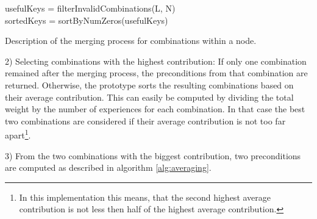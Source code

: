 \begin{algorithm}
	
	\BlankLine
	usefulKeys = filterInvalidCombinations(L, N) \\
	sortedKeys = sortByNumZeros(usefulKeys) \\
	\caption{Description of the merging process for combinations within a node.}
	\label{alg:combinationMerging}
\end{algorithm}

2) Selecting combinations with the highest contribution:
If only one combination remained after the merging process, the preconditions from that combination are returned. 
Otherwise, the prototype sorts the resulting combinations based on their average contribution. This can easily be computed by dividing the total weight by the number of experiences for each combination.
In that case the best two combinations are considered if their average contribution is not too far apart\footnote{In this implementation this means, that the second highest average contribution is not less then half of the highest average contribution.}.

3) From the two combinations with the biggest contribution, two preconditions are computed as described in algorithm \ref{alg:averaging}.

